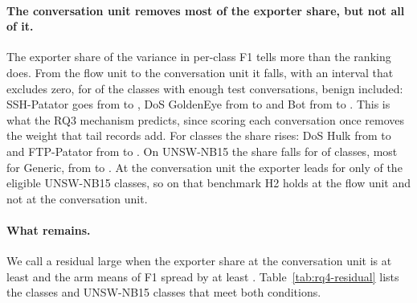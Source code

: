 \paragraph{The conversation unit removes most of the exporter share, but not all of it.} The exporter share of the variance in per-class F1 tells more than the ranking does. From the flow unit to the conversation unit it falls, with an interval that excludes zero, for \RQfourShareFallsCic{} of the \RQfourShareOfCic{} \cicids{} classes with enough test conversations, benign included: SSH-Patator goes from \RQfourSshShareFlow{} to \RQfourSshShareConv{}, DoS GoldenEye from \RQfourGoldenShareFlow{} to \RQfourGoldenShareConv{} and Bot from \RQfourBotShareFlow{} to \RQfourBotShareConv{}. This is what the RQ3 mechanism predicts, since scoring each conversation once removes the weight that tail records add. For \RQfourShareRisesCic{} classes the share rises: DoS Hulk from \RQfourHulkShareFlow{} to \RQfourHulkShareConv{} and FTP-Patator from \RQfourFtpShareFlow{} to \RQfourFtpShareConv{}. On UNSW-NB15 the share falls for \RQfourShareFallsUnsw{} of \RQfourShareOfUnsw{} classes, most for Generic, from \RQfourGenericShareFlow{} to \RQfourGenericShareConv{}. At the conversation unit the exporter leads for only \RQfourUnswConvAbove{} of the \RQfourUnswConvElig{} eligible UNSW-NB15 classes, so on that benchmark H2 holds at the flow unit and not at the conversation unit.

\paragraph{What remains.} We call a residual large when the exporter share at the conversation unit is at least  and the arm means of F1 spread by at least . Table~\ref{tab:rq4-residual} lists the \RQfourLargeCic{} \cicids{} classes and \RQfourLargeUnsw{} UNSW-NB15 classes that meet both conditions.



